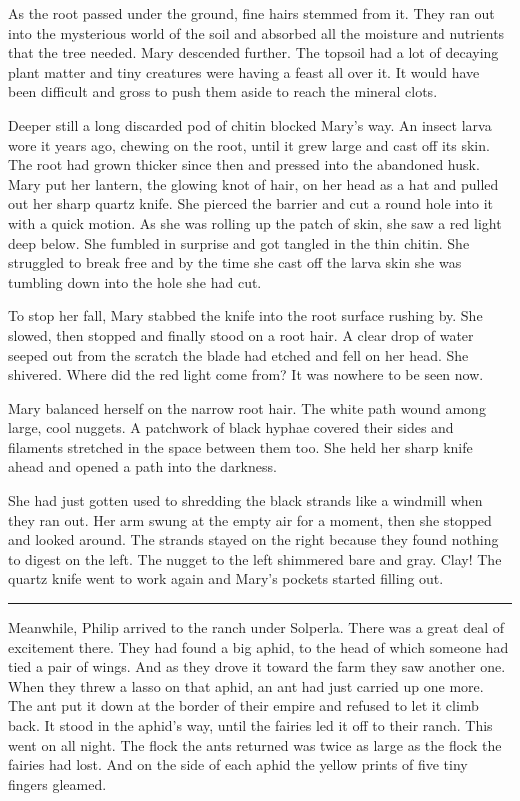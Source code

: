 \documentclass[10pt]{memoir}
\renewcommand{\pfbreakdisplay}{\bigskip \ding{166} \bigskip}
\newcommand{\secbreak}{\fancybreak{\pfbreakdisplay}}
\begin{document}
As the root passed under the ground, fine hairs stemmed from it. They ran out
into the mysterious world of the soil and absorbed all the moisture and
nutrients that the tree needed. Mary descended further. The topsoil had a lot
of decaying plant matter and tiny creatures were having a feast all over it. It
would have been difficult and gross to push them aside to reach the mineral
clots.

Deeper still a long discarded pod of chitin blocked Mary's way. An insect
larva wore it years ago, chewing on the root, until it grew large and cast off
its skin. The root had grown thicker since then and pressed into the abandoned
husk. Mary put her lantern, the glowing knot of hair, on her head as a hat and
pulled out her sharp quartz knife. She pierced the barrier and cut a round hole
into it with a quick motion. As she was rolling up the patch of skin, she saw a
red light deep below. She fumbled in surprise and got tangled in the thin
chitin. She struggled to break free and by the time she cast off the larva
skin she was tumbling down into the hole she had cut.

To stop her fall, Mary stabbed the knife into the root surface rushing by. She
slowed, then stopped and finally stood on a root hair. A clear drop of water
seeped out from the scratch the blade had etched and fell on her head. She
shivered. Where did the red light come from? It was nowhere to be seen now.

Mary balanced herself on the narrow root hair. The white path wound among
large, cool nuggets. A patchwork of black hyphae covered their sides and
filaments stretched in the space between them too. She held her sharp knife
ahead and opened a path into the darkness.

She had just gotten used to shredding the black strands like a windmill when
they ran out. Her arm swung at the empty air for a moment, then she stopped and
looked around. The strands stayed on the right because they found nothing to
digest on the left. The nugget to the left shimmered bare and gray. Clay! The
quartz knife went to work again and Mary's pockets started filling out.

\secbreak

Meanwhile, Philip arrived to the ranch under Solperla. There was a great deal
of excitement there. They had found a big aphid, to the head of which someone
had tied a pair of wings. And as they drove it toward the farm they saw another
one. When they threw a lasso on that aphid, an ant had just carried up one
more. The ant put it down at the border of their empire and refused to let it
climb back. It stood in the aphid's way, until the fairies led it off to their
ranch. This went on all night. The flock the ants returned was twice as large
as the flock the fairies had lost. And on the side of each aphid the yellow
prints of five tiny fingers gleamed.
\end{document}
